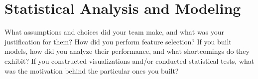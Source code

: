 \section{Statistical Analysis and Modeling}
\label{sec:datAnalisys}
What assumptions and choices did your team make, and
what was your justification for them? How did you perform feature selection? If you built
models, how did you analyze their performance, and what shortcomings do they exhibit?
If you constructed visualizations and/or conducted statistical tests, what was the
motivation behind the particular ones you built?